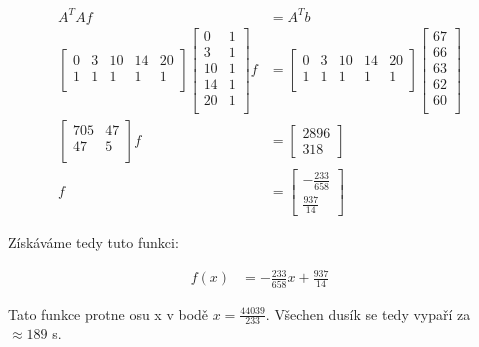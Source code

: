 \documentclass{article}
\begin{document}
\begin{align*}
    A^T A f & = A^Tb \\
    \begin{bmatrix}
        0 & 3 & 10 & 14 & 20 \\
        1 & 1 & 1  & 1  & 1  \\
    \end{bmatrix}
    \begin{bmatrix}
        0  & 1 \\
        3  & 1 \\
        10 & 1 \\
        14 & 1 \\
        20 & 1 \\
    \end{bmatrix}
    f       & =
    \begin{bmatrix}
        0 & 3 & 10 & 14 & 20 \\
        1 & 1 & 1  & 1  & 1  \\
    \end{bmatrix}
    \begin{bmatrix}
        67 \\
        66 \\
        63 \\
        62 \\
        60 \\
    \end{bmatrix}   \\
    \begin{bmatrix}
        705 & 47 \\
        47  & 5  \\
    \end{bmatrix} f
            & =
    \begin{bmatrix}
        2896 \\
        318
    \end{bmatrix}   \\
    f       & =
    \begin{bmatrix}
        -\frac{233}{658} \\
        \frac{937}{14}
    \end{bmatrix}
\end{align*}

Získáváme tedy tuto funkci:

\begin{align*}
    f(x) & = -\frac{233}{658} x + \frac{937}{14}
\end{align*}

Tato funkce protne osu x v bodě $x = \frac{44039}{233}$. Všechen dusík se tedy vypaří za $\approx 189$ \si{\second}.
\end{document}
